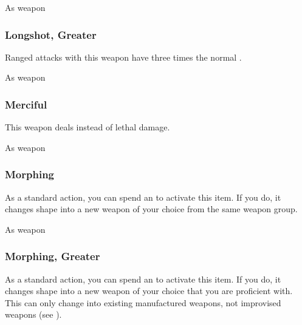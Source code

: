  As weapon


\lowercase{\hypertarget{item:Longshot, Greater}{}}\label{item:Longshot, Greater}
\hypertarget{item:Longshot, Greater}{\subsubsection{Longshot, Greater\hfill{}}}

Ranged attacks with this weapon have three times the normal .



 As weapon


\lowercase{\hypertarget{item:Merciful}{}}\label{item:Merciful}
\hypertarget{item:Merciful}{\subsubsection{Merciful\hfill{}}}

This weapon deals  instead of lethal damage.



 As weapon


\lowercase{\hypertarget{item:Morphing}{}}\label{item:Morphing}
\hypertarget{item:Morphing}{\subsubsection{Morphing\hfill{}}}

As a standard action, you can spend an  to activate this item.
If you do, it changes shape into a new weapon of your choice from the same weapon group.



 


 As weapon


\lowercase{\hypertarget{item:Morphing, Greater}{}}\label{item:Morphing, Greater}
\hypertarget{item:Morphing, Greater}{\subsubsection{Morphing, Greater\hfill{}}}

As a standard action, you can spend an  to activate this item.
If you do, it changes shape into a new weapon of your choice that you are proficient with.
This can only change into existing manufactured weapons, not improvised weapons (see ).



